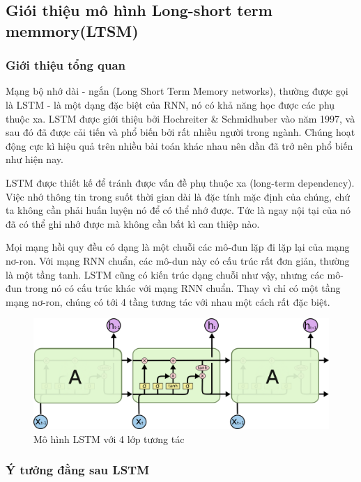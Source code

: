 \subsection{Giói thiệu mô hình Long-short term memmory(LTSM)}
\subsubsection{Giới thiệu tổng quan}

\indent Mạng bộ nhớ dài - ngắn (Long Short Term Memory networks), thường được gọi là LSTM - là một dạng đặc biệt của RNN, nó có khả năng học được các phụ thuộc xa. LSTM được giới thiệu bởi Hochreiter \& Schmidhuber vào năm 1997, và sau đó đã được cải tiến và phổ biến bởi rất nhiều người trong ngành. Chúng hoạt động cực kì hiệu quả trên nhiều bài toán khác nhau nên dần đã trở nên phổ biến như hiện nay.

\indent LSTM được thiết kế để tránh được vấn đề phụ thuộc xa (long-term dependency). Việc nhớ thông tin trong suốt thời gian dài là đặc tính mặc định của chúng, chứ ta không cần phải huấn luyện nó để có thể nhớ được. Tức là ngay nội tại của nó đã có thể ghi nhớ được mà không cần bất kì can thiệp nào.

\indent Mọi mạng hồi quy đều có dạng là một chuỗi các mô-đun lặp đi lặp lại của mạng nơ-ron. Với mạng RNN chuẩn, các mô-dun này có cấu trúc rất đơn giản, thường là một tầng tanh. LSTM cũng có kiến trúc dạng chuỗi như vậy, nhưng các mô-đun trong nó có cấu trúc khác với mạng RNN chuẩn. Thay vì chỉ có một tầng mạng nơ-ron, chúng có tới 4 tầng tương tác với nhau một cách rất đặc biệt.

\begin{figure}[H]
    \centering
    \includegraphics[width=14cm]{Images/Theoretical basis/LSTM.png}
\caption{Mô hình LSTM với 4 lớp tương tác}
\end{figure}
\subsubsection{Ý tưởng đằng sau LSTM}

